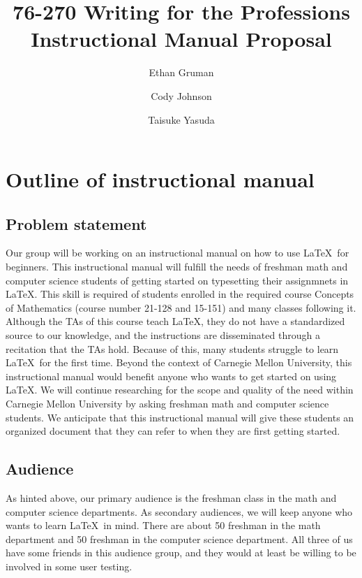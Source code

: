 \documentclass{article}
\title{\normalsize 76-270 Writing for the Professions \\ \LARGE Instructional Manual Proposal}
\author{Ethan Gruman \and Cody Johnson \and Taisuke Yasuda}
\begin{document}
\maketitle

\section{Outline of instructional manual}
\subsection{Problem statement}
Our group will be working on an instructional manual on how to use \LaTeX\ for beginners. This instructional manual will fulfill the needs of freshman math and computer science students of getting started on typesetting their assignmnets in \LaTeX. This skill is required of students enrolled in the required course Concepts of Mathematics (course number 21-128 and 15-151) and many classes following it. Although the TAs of this course teach \LaTeX, they do not have a standardized source to our knowledge, and the instructions are disseminated through a recitation that the TAs hold. Because of this, many students struggle to learn \LaTeX\ for the first time. Beyond the context of Carnegie Mellon University, this instructional manual would benefit anyone who wants to get started on using \LaTeX. We will continue researching for the scope and quality of the need within Carnegie Mellon University by asking freshman math and computer science students. We anticipate that this instructional manual will give these students an organized document that they can refer to when they are first getting started.

\subsection{Audience}
As hinted above, our primary audience is the freshman class in the math and computer science departments. As secondary audiences, we will keep anyone who wants to learn \LaTeX\ in mind. There are about 50 freshman in the math department and 50 freshman in the computer science department. All three of us have some friends in this audience group, and they would at least be willing to be involved in some user testing.
\end{document}
